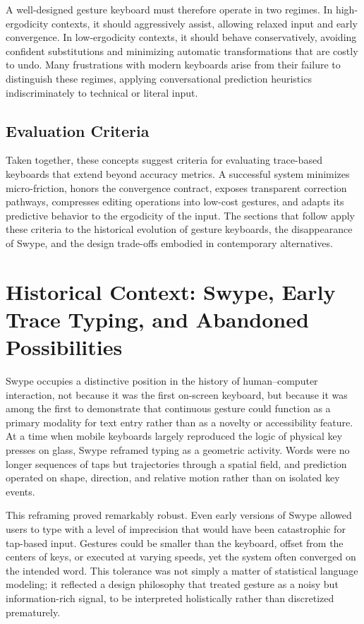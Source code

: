 \documentclass[11pt]{article}
\begin{document}
A well-designed gesture keyboard must therefore operate in two regimes. In high-ergodicity contexts, it should aggressively assist, allowing relaxed input and early convergence. In low-ergodicity contexts, it should behave conservatively, avoiding confident substitutions and minimizing automatic transformations that are costly to undo. Many frustrations with modern keyboards arise from their failure to distinguish these regimes, applying conversational prediction heuristics indiscriminately to technical or literal input.

\subsection{Evaluation Criteria}

Taken together, these concepts suggest criteria for evaluating trace-based keyboards that extend beyond accuracy metrics. A successful system minimizes micro-friction, honors the convergence contract, exposes transparent correction pathways, compresses editing operations into low-cost gestures, and adapts its predictive behavior to the ergodicity of the input. The sections that follow apply these criteria to the historical evolution of gesture keyboards, the disappearance of Swype, and the design trade-offs embodied in contemporary alternatives.

\section{Historical Context: Swype, Early Trace Typing, and Abandoned Possibilities}

Swype occupies a distinctive position in the history of human--computer interaction, not because it was the first on-screen keyboard, but because it was among the first to demonstrate that continuous gesture could function as a primary modality for text entry rather than as a novelty or accessibility feature. At a time when mobile keyboards largely reproduced the logic of physical key presses on glass, Swype reframed typing as a geometric activity. Words were no longer sequences of taps but trajectories through a spatial field, and prediction operated on shape, direction, and relative motion rather than on isolated key events.

This reframing proved remarkably robust. Even early versions of Swype allowed users to type with a level of imprecision that would have been catastrophic for tap-based input. Gestures could be smaller than the keyboard, offset from the centers of keys, or executed at varying speeds, yet the system often converged on the intended word. This tolerance was not simply a matter of statistical language modeling; it reflected a design philosophy that treated gesture as a noisy but information-rich signal, to be interpreted holistically rather than discretized prematurely.
\end{document}
